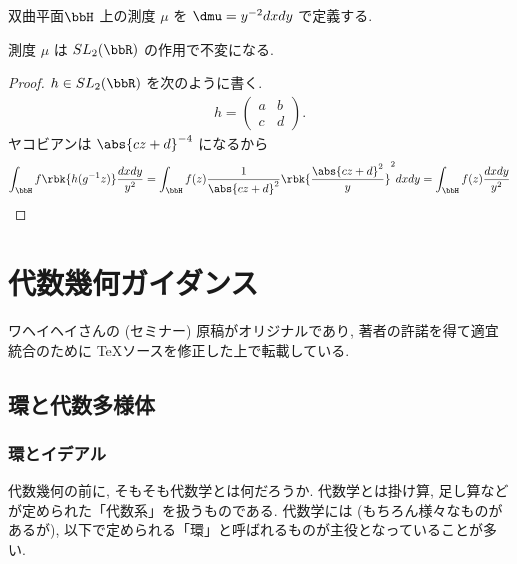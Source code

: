 \documentclass[openany, a4paper, oneside]{jsbook}
\begin{document}
\begin{defn}
 双曲平面$\bbH$ 上の測度 $\mu$ を $\dmu  = y^{-2} dx dy$ で定義する.
\end{defn}
\begin{lem}\label{introduction-to-hyperbolic-geometry12}
 測度 $\mu$ は $SL_2(\bbR)$ の作用で不変になる.
\end{lem}
\begin{proof}
$h \in SL_2(\bbR)$ を次のように書く.
\begin{align}
 h
 =
 \begin{pmatrix}
  a & b \\
  c & d
 \end{pmatrix}.
\end{align}
ヤコビアンは $\abs{cz + d}^{-4}$ になるから
\begin{align}
 \int_{\bbH} f \rbk{h(g^{-1}z)} \frac{dx dy}{y^2}
 =
 \int_{\bbH} f(z) \frac{1}{\abs{cz + d}^2} \rbk{\frac{\abs{cz + d}^2}{y}}^2 dxdy
 =
 \int_{\bbH} f(z) \frac{dx dy}{y^2}
\end{align}
\end{proof}
\chapter{代数幾何ガイダンス}

ワヘイヘイさんの (セミナー) 原稿がオリジナルであり,
著者の許諾を得て適宜統合のために \TeX ソースを修正した上で転載している.

\nocite{GrothendieckDieudonne1}
\nocite{JeanPierreSerre1}
\nocite{RobinHartshorne1}
\nocite{GortzWedhorn1}
\nocite{NagataMiyanishiMaruyama1}
\nocite{ToshiyukiKatsura4}
\nocite{YujiroKawamata1}
\nocite{KenjiUeno1}
\nocite{ShihokoIshii1}
\nocite{MasayoshiNagata1}
\nocite{Atiyah-Macdonald}
\section{環と代数多様体}

\subsection{環とイデアル}

代数幾何の前に, そもそも代数学とは何だろうか.
代数学とは掛け算, 足し算などが定められた「代数系」を扱うものである.
代数学には (もちろん様々なものがあるが), 以下で定められる「環」と呼ばれるものが主役となっていることが多い.
\end{document}
